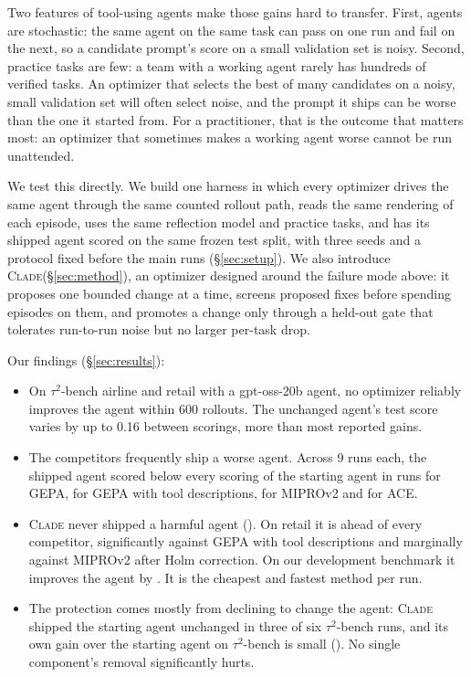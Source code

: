 \documentclass[11pt]{article}
\newcommand{\clade}{\textsc{Clade}\xspace}
\newcommand{\taub}{$\tau^2$-bench\xspace}
\begin{document}
Two features of tool-using agents make those gains hard to transfer. First, agents are stochastic: the same agent on
the same task can pass on one run and fail on the next, so a candidate prompt's score on a small validation set is
noisy. Second, practice tasks are few: a team with a working agent rarely has hundreds of verified tasks. An
optimizer that selects the best of many candidates on a noisy, small validation set will often select noise, and the
prompt it ships can be worse than the one it started from. For a practitioner, that is the outcome that matters most:
an optimizer that sometimes makes a working agent worse cannot be run unattended.

We test this directly. We build one harness in which every optimizer drives the same agent through the same counted
rollout path, reads the same rendering of each episode, uses the same reflection model and practice tasks, and has
its shipped agent scored on the same frozen test split, with three seeds and a protocol fixed before the main runs
(\S\ref{sec:setup}). We also introduce \clade (\S\ref{sec:method}), an optimizer designed around the failure mode
above: it proposes one bounded change at a time, screens proposed fixes before spending episodes on them, and
promotes a change only through a held-out gate that tolerates run-to-run noise but no larger per-task drop.

Our findings (\S\ref{sec:results}):
\begin{itemize}
\setlength\itemsep{0pt}\setlength\parsep{2pt}
\item On \taub airline and retail with a gpt-oss-20b agent, no optimizer reliably improves the agent within 600
rollouts. The unchanged agent's test score varies by up to 0.16 between scorings, more than most reported gains.
\item The competitors frequently ship a worse agent. Across 9 runs each, the shipped agent
scored below every scoring of the starting agent in \harmGepa{} runs for GEPA, \harmGepatools{} for GEPA with tool
descriptions, \harmMipro{} for MIPROv2 and \harmAce{} for ACE.
\item \clade never shipped a harmful agent (\harmClade{}). On retail it is ahead of every competitor, significantly
against GEPA with tool descriptions and marginally against MIPROv2 after Holm correction. On our development benchmark it improves the
agent by \cladeSdGain{}. It is the cheapest and fastest method per run.
\item The protection comes mostly from declining to change the agent: \clade shipped the starting agent unchanged in
three of six \taub runs, and its own gain over the starting agent on \taub is small (\cladePooledGain{}). No single
component's removal significantly hurts.
\end{itemize}
\end{document}
